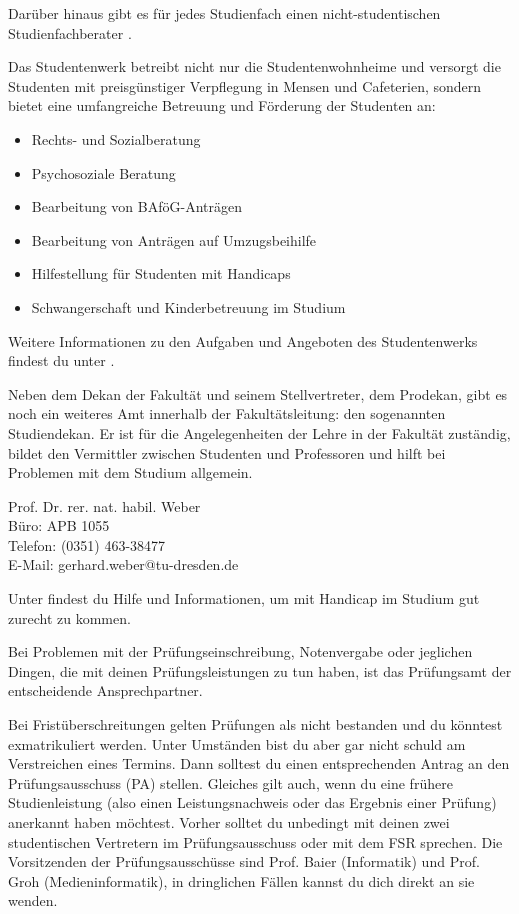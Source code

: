 Darüber hinaus gibt es für jedes Studienfach einen nicht-studentischen Studienfachberater .

\newpage

Das Studentenwerk betreibt nicht nur die Studentenwohnheime und versorgt die Studenten mit preisgünstiger Verpflegung in Mensen und Cafeterien, sondern bietet eine umfangreiche Betreuung und Förderung der Studenten an:
\begin{itemize}
\item Rechts- und Sozialberatung
\item Psychosoziale Beratung
\item Bearbeitung von BAföG-Anträgen
\item Bearbeitung von Anträgen auf Umzugsbeihilfe
\item Hilfestellung für Studenten mit Handicaps
\item Schwangerschaft und Kinderbetreuung im Studium
\end{itemize}
Weitere Informationen zu den Aufgaben und Angeboten des Studentenwerks findest du unter .

Neben dem Dekan der Fakultät und seinem Stellvertreter, dem Prodekan, gibt es noch ein weiteres Amt innerhalb der Fakultätsleitung:
den sogenannten Studiendekan.
Er ist für die Angelegenheiten der Lehre in der Fakultät zuständig, bildet den Vermittler zwischen Studenten und Professoren und hilft bei Problemen mit dem Studium allgemein.

Prof. Dr. rer. nat. habil. Weber \\
Büro: APB 1055 \\
Telefon: (0351) 463-38477 \\
E-Mail: gerhard.weber@tu-dresden.de

Unter  findest du Hilfe und Informationen, um mit Handicap im Studium gut zurecht zu kommen.

\newpage

\label{sec:pruefungsamt}
Bei Problemen mit der Prüfungseinschreibung, Notenvergabe oder jeglichen Dingen, die mit deinen Prüfungsleistungen zu tun haben, ist das Prüfungsamt der entscheidende Ansprechpartner.

Bei Fristüberschreitungen gelten Prüfungen als nicht bestanden und du könntest exmatrikuliert werden.
Unter Umständen bist du aber gar nicht schuld am Verstreichen eines Termins.
Dann solltest du einen entsprechenden Antrag an den Prüfungsausschuss (PA) stellen.
Gleiches gilt auch, wenn du eine frühere Studienleistung (also einen Leistungsnachweis oder das Ergebnis einer Prüfung) anerkannt haben möchtest.
Vorher solltet du unbedingt mit deinen zwei studentischen Vertretern im Prüfungsausschuss oder mit dem FSR sprechen.
Die Vorsitzenden der Prüfungsausschüsse sind Prof. Baier (Informatik) und Prof. Groh (Medieninformatik), in dringlichen Fällen kannst du dich direkt an sie wenden.

